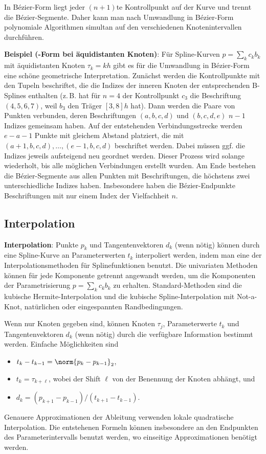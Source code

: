 In Bézier-Form liegt jeder $(n + 1)$te Kontrollpunkt auf der Kurve und trennt die Bézier-Segmente.
Daher kann man nach Umwandlung in Bézier-Form polynomiale Algorithmen simultan auf den
verschiedenen Knotenintervallen durchführen.

\linie
\pagebreak

\textbf{Beispiel (-Form bei äquidistanten Knoten)}:
Für Spline-Kurven $p = \sum_k c_k b_k$ mit äquidistanten Knoten $\tau_k = kh$ gibt es
für die Umwandlung in Bézier-Form eine schöne geometrische Interpretation.
Zunächst werden die Kontrollpunkte mit den Tupeln beschriftet, die die Indizes der inneren Knoten
der entsprechenden B-Splines enthalten (z.\,B. hat für $n = 4$ der Kontrollpunkt
$c_3$ die Beschriftung $(4, 5, 6, 7)$, weil $b_3$ den Träger $[3, 8]h$ hat).
Dann werden die Paare von Punkten verbunden, deren Beschriftungen $(a, b, c, d)$ und
$(b, c, d, e)$ $n - 1$ Indizes gemeinsam haben.
Auf der entstehenden Verbindungsstrecke werden $e - a - 1$ Punkte mit gleichem Abstand platziert,
die mit $(a + 1, b, c, d), \dotsc, (e - 1, b, c, d)$ beschriftet werden.
Dabei müssen ggf. die Indizes jeweils aufsteigend neu geordnet werden.
Dieser Prozess wird solange wiederholt, bis alle möglichen Verbindungen erstellt wurden.
Am Ende bestehen die Bézier-Segmente aus allen Punkten mit Beschriftungen, die höchstens
zwei unterschiedliche Indizes haben.
Insbesondere haben die Bézier-Endpunkte Beschriftungen mit nur einem Index der Vielfachheit $n$.

\subsection{%
    Interpolation%
}

\textbf{Interpolation}:
Punkte $p_k$ und Tangentenvektoren $d_k$ (wenn nötig) können durch eine
Spline-Kurve an Parameterwerten $t_k$ interpoliert werden, indem man eine der
Interpolationsmethoden für Splinefunktionen benutzt.
Die univariaten Methoden können für jede Komponente getrennt angewandt werden,
um die Komponenten der Parametrisierung $p = \sum_k c_k b_k$ zu erhalten.
Standard-Methoden sind die kubische Hermite-Interpolation und die kubische Spline-Interpolation
mit Not-a-Knot, natürlichen oder eingespannten Randbedingungen.

Wenn nur Knoten gegeben sind, können Knoten $\tau_j$, Parameterwerte $t_k$ und
Tangentenvektoren $d_k$ (wenn nötig) durch die verfügbare Information bestimmt werden.
Einfache Möglichkeiten sind
\begin{itemize}
    \item
    $t_k - t_{k-1} = \norm{p_k - p_{k-1}}_2$,
    
    \item
    $t_k = \tau_{k+\ell}$, wobei der Shift $\ell$ von der Benennung der Knoten abhängt, und
    
    \item
    $d_k = (p_{k+1} - p_{k-1}) / (t_{k+1} - t_{k-1})$.
\end{itemize}
Genauere Approximationen der Ableitung verwenden lokale quadratische Interpolation.
Die entstehenen Formeln können insbesondere an den Endpunkten des Parameterintervalls benutzt
werden, wo einseitige Approximationen benötigt werden.

